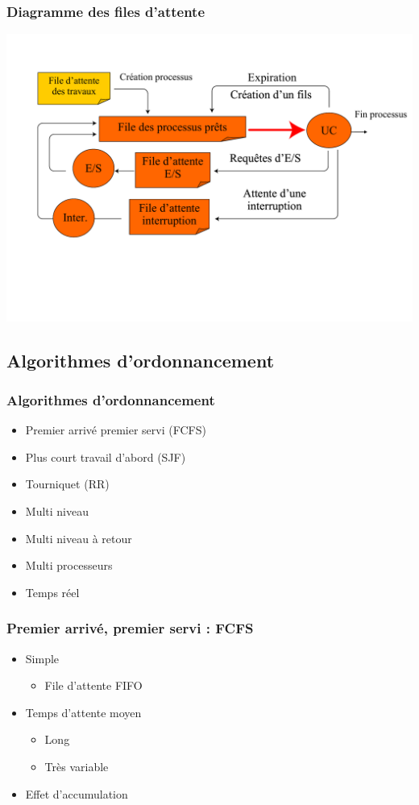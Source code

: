 \begin{frame}
 \frametitle{Diagramme des files d’attente}
 \includegraphics[width=\textwidth]{../illustration/diag_file_attente.pdf}
\end{frame}


\subsection{Algorithmes d'ordonnancement}

\begin{frame}
 \frametitle{Algorithmes d’ordonnancement}
 \begin{itemize}
 \item Premier arrivé premier servi (FCFS)
 \item Plus court travail d’abord (SJF)
 \item Tourniquet (RR)
 \item Multi niveau
 \item Multi niveau à retour
 \item Multi processeurs
 \item Temps réel
\end{itemize}
\end{frame}



\begin{frame}
 \frametitle{Premier arrivé, premier servi : FCFS}
 \begin{itemize}
 \item Simple
 \begin{itemize}
 \item File d’attente FIFO
 \end{itemize}
 \item Temps d’attente moyen
 \begin{itemize}
 \item Long
 \item Très variable
 \end{itemize}
 \item Effet d’accumulation
 \end{itemize}
\end{frame}


